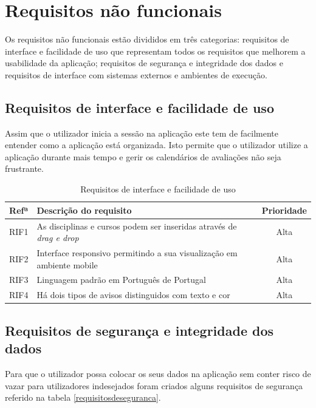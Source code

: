 \documentclass[12pt, twoside]{report}
\begin{document}
	
	\section{Requisitos não funcionais}
	
	Os requisitos não funcionais estão divididos em três categorias: requisitos de interface e facilidade de uso que representam todos os requisitos que melhorem a usabilidade da aplicação; requisitos de segurança e integridade dos dados e requisitos de interface com sistemas externos e ambientes de execução.
	
	\subsection{Requisitos de interface e facilidade de uso}

Assim que o utilizador inicia a sessão na aplicação este tem de facilmente entender como a aplicação está organizada.
Isto permite que o utilizador utilize a aplicação durante mais tempo e gerir os calendários de avaliações não seja frustrante.
	
	\begin{table}[H]
	\caption{Requisitos de interface e facilidade de uso}
	
	\begin{center}
		\begin{tabularx}{\textwidth}{|c|X|c|}
			\hline
			\textbf{Refª }	& \textbf{Descrição do requisito} & \textbf{Prioridade} \\
			\hline
			RIF1 & As disciplinas e cursos podem ser inseridas através de \textit{drag e drop} &Alta\\
			\hline
			RIF2 & Interface responsivo permitindo a sua visualização em ambiente mobile &Alta\\
			\hline
			RIF3 & Linguagem padrão em Português de Portugal &Alta\\
			\hline
			RIF4 & Há dois tipos de avisos distinguidos com texto e cor &Alta\\
			\hline
		\end{tabularx}
		\label{requisitosdeinterface}
	\end{center}
	\end{table}

	\subsection{Requisitos de segurança e integridade dos dados}
	
	Para que o utilizador possa colocar os seus dados na aplicação sem conter risco de vazar para utilizadores indesejados foram criados alguns requisitos de segurança referido na	tabela \ref{requisitosdeseguranca}.
	
\end{document}
